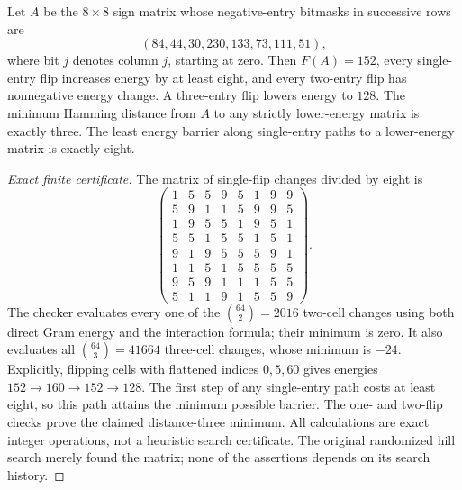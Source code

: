 \begin{theorem}
\label{thm:spectral-eight-trap}
Let $A$ be the $8\times8$ sign matrix whose negative-entry bitmasks in
successive rows are
\[
 (84,44,30,230,133,73,111,51),
\]
where bit $j$ denotes column $j$, starting at zero. Then $F(A)=152$,
every single-entry flip increases energy by at least eight, and every
two-entry flip has nonnegative energy change. A three-entry flip lowers
energy to $128$. The minimum Hamming distance from $A$ to any
strictly lower-energy matrix is exactly three. The least energy barrier
along single-entry paths to a lower-energy matrix is exactly eight.
\end{theorem}
\begin{proof}[Exact finite certificate]
The matrix of single-flip changes divided by eight is
\[
 \begin{pmatrix}
 1&5&5&9&5&1&9&9\\
 5&9&1&1&5&9&9&5\\
 1&9&5&5&1&9&5&1\\
 5&5&1&5&5&1&5&1\\
 9&1&9&5&5&5&9&1\\
 1&1&5&1&5&5&5&5\\
 9&5&9&1&1&1&5&5\\
 5&1&1&9&1&5&5&9
 \end{pmatrix}.
\]
The checker evaluates every one of the $\binom{64}{2}=2016$ two-cell
changes using both direct Gram energy and the interaction formula;
their minimum is zero. It also evaluates all $\binom{64}{3}=41664$
three-cell changes, whose minimum is $-24$. Explicitly, flipping cells
with flattened indices $0,5,60$ gives energies
$152\to160\to152\to128$. The first step of any single-entry path
costs at least eight, so this path attains the minimum possible barrier.
The one- and two-flip checks prove the claimed distance-three minimum.
All calculations are exact integer operations, not a heuristic search
certificate. The original randomized hill search merely found the
matrix; none of the assertions depends on its search history.
\end{proof}

